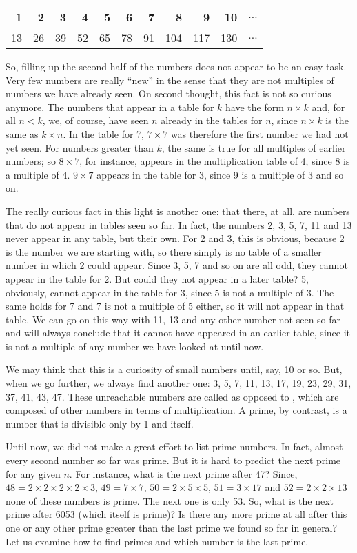 \documentclass{scrreprt}
\begin{document}
\begin{tabular}{r|r|r|r|r|r|r|r|r|r|c}
1  & 2  &  3 & 4  & 5  & 6  & 7   & 8   & 9   & 10  & $\dots$ \\\hline
13 & 26 & 39 & 52 & 65 & 78 &  91 & 104 & 117 & 130 & $\dots$
\end{tabular}

So, filling up the second half of the numbers
does not appear to be an easy task.
Very few numbers are really ``new'' in the sense
that they are not multiples of numbers we have already seen.
On second thought, this fact is not so curious anymore.
The numbers that appear in a table for $k$ have the form
$n \times k$ and, for all $n < k$, we, of course, have seen $n$
already in the tables for $n$, since $n \times k$ is the same as
$k \times n$.
In the table for 7, $7 \times 7$ was therefore
the first number we had not yet seen.
For numbers greater than $k$,
the same is true for all multiples of earlier numbers;
so $8 \times 7$, for instance, appears in the multiplication
table of 4, since 8 is a multiple of 4.
$9 \times 7$ appears in the table for 3, since 9 is a multiple of 3
and so on.

The really curious fact in this light is another one:
that there, at all, are numbers that do not appear in tables seen so far.
In fact, the numbers 2, 3, 5, 7, 11 and 13 never appear in any table,
but their own.
For 2 and 3, this is obvious, because
2 is the number we are starting with,
so there simply is no table of a smaller number
in which 2 could appear.
Since 3, 5, 7 and so on are all odd, they cannot appear
in the table for 2. 
But could they not appear in a later table?
5, obviously, cannot appear in the table for 3,
since 5 is not a multiple of 3.
The same holds for 7 and 7 is 
not a multiple of 5 either, so it will not appear
in that table. 
We can go on this way with 11, 13 and any other number
not seen so far and will always conclude
that it cannot have appeared in an earlier table,
since it is not a multiple of any number
we have looked at until now.

We may think that this is a curiosity of small numbers
until, say, 10 or so. But, when we go further, we always find another one:
3, 5, 7, 11, 13, 17, 19, 23, 29, 31, 37, 41, 43, 47.
These unreachable numbers are called  as opposed to
, which are composed 
of other numbers in terms of multiplication.
A prime, by contrast, is a number
that is divisible only by 1 and itself.

Until now, we did not make a great effort to list prime numbers.
In fact, almost every second number so far was prime.
But it is hard to predict the next prime for any given $n$.
For instance, what is the next prime after 47?
Since, $48 = 2 \times 2 \times 2 \times 2 \times 3$, 
$49 = 7 \times 7$, $50 = 2 \times 5 \times 5$,
$51 = 3 \times 17$ and $52 = 2 \times 2 \times 13$
none of these numbers is prime.
The next one is only 53. 
So, what is the next prime after \num{6053}
(which itself is prime)?
Is there any more prime at all after this one
or any other prime
greater than the last prime we found so far in general?
Let us examine how to find primes and 
which number is the last prime.
\end{document}
